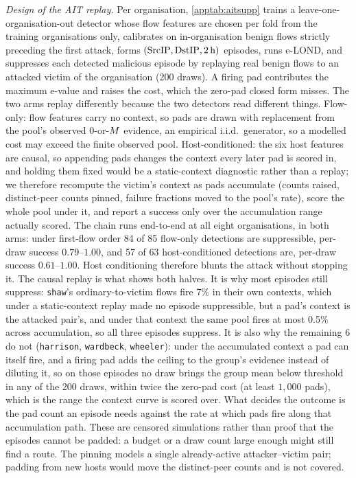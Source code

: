 \emph{Design of the AIT replay.} Per organisation, \cref{apptab:aitsupp} trains a
leave-one-organisation-out detector whose flow features are chosen per fold from the training
organisations only, calibrates on in-organisation benign flows strictly preceding the first attack,
forms $(\mathrm{SrcIP},\mathrm{DstIP},\text{2\,h})$ episodes, runs e-LOND, and suppresses each detected
malicious episode by replaying real benign flows to an attacked victim of the organisation (200
draws). A firing pad contributes the maximum e-value and raises the cost, which the zero-pad closed form
misses. The two arms replay differently because the two detectors read different things. Flow-only:
flow features carry no context, so pads are drawn with replacement from the pool's observed
$0$-or-$M$ evidence, an empirical i.i.d.\ generator, so a modelled cost may exceed the finite
observed pool. Host-conditioned: the six host features are causal, so appending pads changes the
context every later pad is scored in, and holding them fixed would be a static-context diagnostic
rather than a replay; we therefore recompute the victim's context as pads accumulate (counts raised,
distinct-peer counts pinned, failure fractions moved to the pool's rate), score the whole pool under
it, and report a success only over the accumulation range actually scored. The chain runs end-to-end
at all eight organisations, in both arms: under first-flow order 84 of 85 flow-only detections are
suppressible, per-draw success $0.79$--$1.00$, and 57 of 63 host-conditioned
detections are, per-draw success $0.61$--$1.00$. Host conditioning therefore blunts the attack
without stopping it. The causal replay is what shows both halves. It is why most episodes still
suppress: \texttt{shaw}'s ordinary-to-victim flows fire 7\% in
their own contexts, which under a static-context replay made no episode suppressible, but a pad's
context is the attacked pair's, and under that context the same pool fires at most
0.5\% across accumulation, so all three episodes suppress. It is also why the
remaining 6 do not (\texttt{harrison}, \texttt{wardbeck}, \texttt{wheeler}): under the accumulated context a pad can
itself fire, and a firing pad adds the ceiling to the group's evidence instead of diluting it, so on
those episodes no draw brings the group mean below threshold in any of the 200 draws, within twice
the zero-pad cost (at least $1{,}000$ pads), which is the range the context curve is scored over. What
decides the outcome is the pad count an episode needs against the rate at which pads fire along that
accumulation path. These are censored simulations rather than proof that the episodes cannot be
padded: a budget or a draw count large enough might still find a route. The pinning
models a single already-active attacker--victim pair; padding from new hosts would move the
distinct-peer counts and is not covered.
